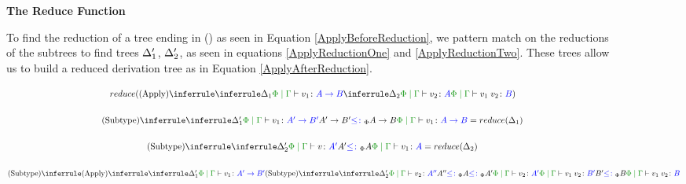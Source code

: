 \documentclass{Report}
\begin{document}
\begin{figure}[H]
    \begin{framed}
        {\centering
            \textbf{The Reduce Function}   \par
        }

    \case{\vapply}
    To find the reduction of a tree ending in (\textit{\vapply}) as seen in Equation \ref{ApplyBeforeReduction}, we pattern match on the reductions of the subtrees to find trees $\Delta_1'$, $\Delta_2'$, as seen in equations \ref{ApplyReductionOne} and \ref{ApplyReductionTwo}. These trees allow us to build a reduced derivation tree as in Equation \ref{ApplyAfterReduction}.

    \begin{equation}\label{ApplyBeforeReduction}
        \scalebox{.8}{$
        \reduce(\ntreeruleII{\vapply}{
            \treeruleI{\D_1}{
                \gpetyperelation{v_1}{\ab}
            }
        }{
            \treeruleI{\D_2}{
                \gpetyperelation{v_2}{A}
            }
        }{
            \gpetyperelation{\apply{v_1}{v_2}}{B}
        })
        $}
    \end{equation}

    \begin{equation}\label{ApplyReductionOne}
        \scalebox{.8}{$
            \ntreeruleII{\vsubtype}{
                \treeruleI{\D'_1}{\gpetyperelation{v_1}{\fntype{A'}{B'}}}
            }{
                \fntype{A'}{B'}\subtypep\fntype{A}{B}
            }{
                \gpetyperelation{v_1}{\ab}
            }  = \reduce(\D_1)
            $}
    \end{equation}

    \begin{equation}\label{ApplyReductionTwo}
        \scalebox{.8}{$
        \ntreeruleII{\vsubtype}{
            \treeruleI{\D'_2}{\gpetyperelation{v}{A'}}
        }{
            A'\subtypep A
        }{
            \gpetyperelation{v_1}{A}
        } = \reduce(\D_2)
        $}
    \end{equation}


    \begin{equation}\label{ApplyAfterReduction}
        \scalebox{.8}{$
        \ntreeruleII{\vsubtype}{
            \ntreeruleII{\vapply}{
                \treeruleI{
                    \D'_1
                }{
                    \gpetyperelation{v_1}{\fntype{A'}{B'}}
                }
            }{
                \ntreeruleII{\vsubtype}{
                    \treeruleI{\D'_2}{\gpetyperelation{v_2}{A''}}
                }{
                    A'' \subtypep A \subtypep A'
                } {
                    \gpetyperelation{v_2}{A'}
                }
            }{
                \gpetyperelation{\apply{v_1}{v_2}}{B'}
            }
        }{
            B' \subtypep B
        }{
            \gpetyperelation{\apply{v_1}{v_2}}{B}
        }
        $}
    \end{equation}



\end{framed}
\end{figure}
\end{document}
